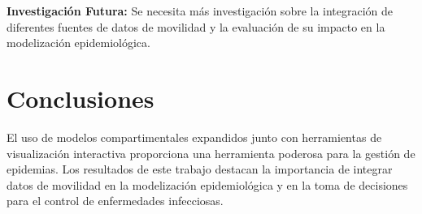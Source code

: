 \documentclass[sigconf]{acmart}
\begin{document}
\textbf{Investigación Futura:} Se necesita más investigación sobre la integración de diferentes fuentes de datos de movilidad y la evaluación de su impacto en la modelización epidemiológica.

\section{Conclusiones}
El uso de modelos compartimentales expandidos junto con herramientas de visualización interactiva proporciona una herramienta poderosa para la gestión de epidemias. Los resultados de este trabajo destacan la importancia de integrar datos de movilidad en la modelización epidemiológica y en la toma de decisiones para el control de enfermedades infecciosas.



\end{document}
